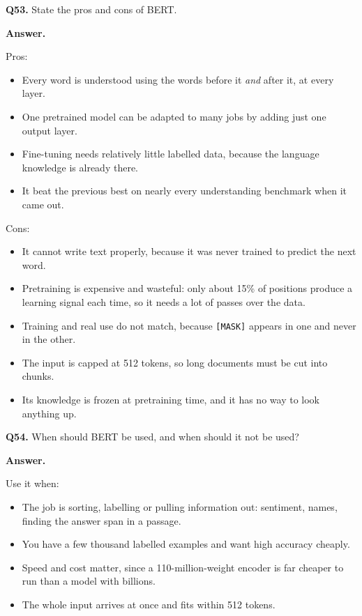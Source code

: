 \documentclass[11pt]{article}
\begin{document}
\medskip
\textbf{Q53.} State the pros and cons of BERT.

\textbf{Answer.}

Pros:
\begin{itemize}
  \item Every word is understood using the words before it \emph{and} after it, at every layer.
  \item One pretrained model can be adapted to many jobs by adding just one output layer.
  \item Fine-tuning needs relatively little labelled data, because the language knowledge is already there.
  \item It beat the previous best on nearly every understanding benchmark when it came out.
\end{itemize}

Cons:
\begin{itemize}
  \item It cannot write text properly, because it was never trained to predict the next word.
  \item Pretraining is expensive and wasteful: only about 15\% of positions produce a learning signal each time, so it needs a lot of passes over the data.
  \item Training and real use do not match, because \texttt{[MASK]} appears in one and never in the other.
  \item The input is capped at 512 tokens, so long documents must be cut into chunks.
  \item Its knowledge is frozen at pretraining time, and it has no way to look anything up.
\end{itemize}

\medskip
\textbf{Q54.} When should BERT be used, and when should it not be used?

\textbf{Answer.}

Use it when:
\begin{itemize}
  \item The job is sorting, labelling or pulling information out: sentiment, names, finding the answer span in a passage.
  \item You have a few thousand labelled examples and want high accuracy cheaply.
  \item Speed and cost matter, since a 110-million-weight encoder is far cheaper to run than a model with billions.
  \item The whole input arrives at once and fits within 512 tokens.
\end{itemize}
\end{document}
